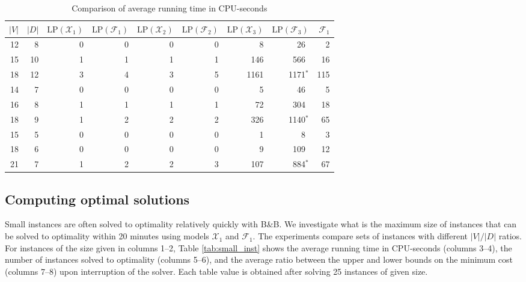 \begin{table}[h!]
\centering
\setlength{\tabcolsep}{6pt} %
\renewcommand{\arraystretch}{1.4} %
\begin{tabular}{rrrrrrrrr}
 $|V|$ & $|D|$ & $\text{LP}(\mathcal{X}_1)$ & $\text{LP}(\mathcal{F}_1)$ & $\text{LP}(\mathcal{X}_2)$ & $\text{LP}(\mathcal{F}_2)$ & $\text{LP}(\mathcal{X}_3)$ & $\text{LP}(\mathcal{F}_3)$ & $\mathcal{F}_1$\\ \hline
  12 & 8       & 0   & 0   & 0     & 0     & 8    & 26\textcolor{white}{$^*$}   & 2   \\
  15 & 10      & 1   & 1   & 1     & 1     & 146  & 566\textcolor{white}{$^*$}  & 16  \\
  18 & 12      & 3   & 4   & 3     & 5     & 1161 & 1171$^*$                    & 115 \\\hline
  14 & 7       & 0   & 0   & 0     & 0     & 5    & 46\textcolor{white}{$^*$}   & 5   \\ 
  16 & 8       & 1   & 1   & 1     & 1     & 72   & 304\textcolor{white}{$^*$}  & 18  \\
  18 & 9       & 1   & 2   & 2     & 2     & 326  & 1140$^*$                    & 65  \\ \hline
  15 & 5       & 0   & 0   & 0     & 0     & 1    & 8\textcolor{white}{$^*$}    & 3   \\ 
  18 & 6       & 0   & 0   & 0     & 0     & 9    & 109\textcolor{white}{$^*$}  & 12  \\ 
  21 & 7       & 1   & 2   & 2     & 3     & 107  & 884$^*$                     & 67
\end{tabular}
\caption{Comparison of average running time in CPU-seconds}
\label{tab:small_inst_time}
\end{table}

\subsection{Computing optimal solutions}
\label{sec:expsmall}

Small instances are often solved to optimality relatively quickly with B\&B.
We investigate what is the maximum size of instances that can be solved to optimality within 20 minutes using models $\mathcal{X}_1$ and $\mathcal{F}_1$.
The experiments compare sets of instances with different $|V|/|D|$ ratios.
For instances of the size given in columns 1--2, Table \ref{tab:small_inst} shows the average running time in CPU-seconds (columns 3--4),
the number of instances solved to optimality (columns 5--6),
and the average ratio between the upper and lower bounds on the minimum cost (columns 7--8) upon interruption of the solver.
Each table value is obtained after solving 25 instances of given size.

